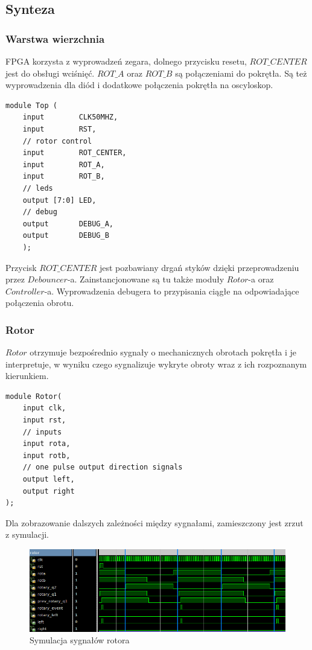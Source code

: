 \documentclass[a4paper,12pt]{article}
\begin{document}
\subsection{Synteza}

\subsubsection{Warstwa wierzchnia}

FPGA korzysta z wyprowadzeń zegara, dolnego przycisku resetu, $ROT\_CENTER$ jest do obsługi wciśnięć. $ROT\_A$ oraz $ROT\_B$ są połączeniami do pokrętła. Są też wyprowadzenia dla diód i dodatkowe połączenia pokrętła na oscyloskop.
\begin{lstlisting}[label=Rs232Tx,caption=Rs232Tx.v,firstnumber=14]
module Top (
    input        CLK50MHZ,
    input        RST,
    // rotor control
    input        ROT_CENTER,
    input        ROT_A,
    input        ROT_B,
    // leds
    output [7:0] LED,
    // debug
    output       DEBUG_A,
    output       DEBUG_B
    );
\end{lstlisting}
Przycisk $ROT\_CENTER$ jest pozbawiany drgań styków dzięki przeprowadzeniu przez $Debouncer$-a. Zainstancjonowane są tu także moduły $Rotor$-a oraz $Controller$-a. Wyprowadzenia debugera to przypisania ciągłe na odpowiadające połączenia obrotu.

\subsubsection{Rotor}
$Rotor$ otrzymuje bezpośrednio sygnały o mechanicznych obrotach pokrętła i je interpretuje, w wyniku czego sygnalizuje wykryte obroty wraz z ich rozpoznanym kierunkiem.
\begin{lstlisting}[label=Rotor,caption=Rotor.v]
module Rotor(
    input clk,
    input rst,
    // inputs
    input rota,
    input rotb,
    // one pulse output direction signals
    output left,
    output right
);
\end{lstlisting}

Dla zobrazowanie dalszych zależności między sygnałami, zamieszczony jest zrzut z symulacji.
\begin{figure}[htb]
   \centering
   \includegraphics[width=15cm]{grafika/rotor.png}
   \caption{Symulacja sygnałów rotora}
\end{figure}
\end{document}
